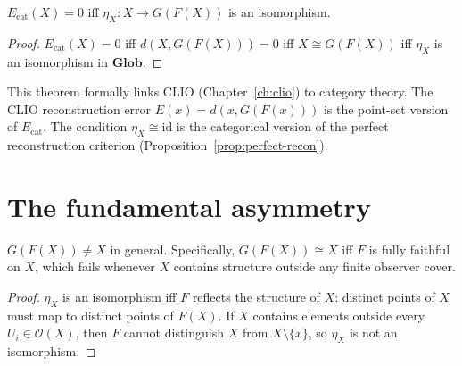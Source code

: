 \begin{theorem}
  \label{thm:error-unit}
  \statusproven{}
  $E_{\mathrm{cat}}(X) = 0$ iff $\eta_X : X \to G(F(X))$
  is an isomorphism.
\end{theorem}

\begin{proof}
  $E_{\mathrm{cat}}(X) = 0$ iff $d(X, G(F(X))) = 0$
  iff $X \cong G(F(X))$
  iff $\eta_X$ is an isomorphism in $\mathbf{Glob}$.
\end{proof}

\begin{ChapterConnection}
  This theorem formally links CLIO (Chapter~\ref{ch:clio})
  to category theory.
  The CLIO reconstruction error $E(x) = d(x, G(F(x)))$
  is the point-set version of $E_{\mathrm{cat}}$.
  The condition $\eta_X \cong \mathrm{id}$ is the categorical
  version of the perfect reconstruction criterion
  (Proposition~\ref{prop:perfect-recon}).
\end{ChapterConnection}

\section{The fundamental asymmetry}

\begin{theorem}
  \label{thm:analysis-synthesis-differ}
  \statusproven{}
  $G(F(X)) \neq X$ in general.
  Specifically, $G(F(X)) \cong X$ iff $F$ is fully faithful
  on $X$, which fails whenever $X$ contains structure
  outside any finite observer cover.
\end{theorem}

\begin{proof}
  $\eta_X$ is an isomorphism iff $F$ reflects the structure
  of $X$: distinct points of $X$ must map to distinct points
  of $F(X)$.
  If $X$ contains elements outside every $U_i \in \mathcal{O}(X)$,
  then $F$ cannot distinguish $X$ from $X \setminus \{x\}$,
  so $\eta_X$ is not an isomorphism.
\end{proof}


